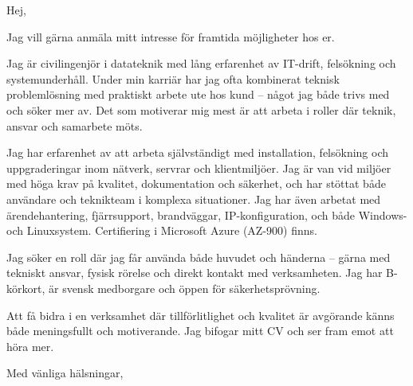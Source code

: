 \documentclass[a4paper,11pt]{letter}
\date{\today}
\begin{document}
\begin{letter}{}

\opening{Hej,}

Jag vill gärna anmäla mitt intresse för framtida möjligheter hos er. 

Jag är civilingenjör i datateknik med lång erfarenhet av IT-drift, felsökning och systemunderhåll. Under min karriär har jag ofta kombinerat teknisk problemlösning med praktiskt arbete ute hos kund – något jag både trivs med och söker mer av. Det som motiverar mig mest är att arbeta i roller där teknik, ansvar och samarbete möts.

Jag har erfarenhet av att arbeta självständigt med installation, felsökning och uppgraderingar inom nätverk, servrar och klientmiljöer. Jag är van vid miljöer med höga krav på kvalitet, dokumentation och säkerhet, och har stöttat både användare och teknikteam i komplexa situationer. Jag har även arbetat med ärendehantering, fjärrsupport, brandväggar, IP-konfiguration, och både Windows- och Linuxsystem. Certifiering i Microsoft Azure (AZ-900) finns.

Jag söker en roll där jag får använda både huvudet och händerna – gärna med tekniskt ansvar, fysisk rörelse och direkt kontakt med verksamheten. Jag har B-körkort, är svensk medborgare och öppen för säkerhetsprövning.

Att få bidra i en verksamhet där tillförlitlighet och kvalitet är avgörande känns både meningsfullt och motiverande. Jag bifogar mitt CV och ser fram emot att höra mer.

\closing{Med vänliga hälsningar,}

\end{letter}
\end{document}
